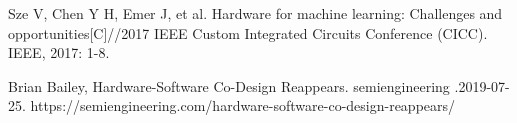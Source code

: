 \setlength{\bibsep}{1ex}  %
\begin{thebibliography}{99}
\thispagestyle{fancy}



Sze V, Chen Y H, Emer J, et al. Hardware for machine learning: Challenges and opportunities[C]//2017 IEEE Custom Integrated Circuits Conference (CICC). IEEE, 2017: 1-8.

Brian Bailey, Hardware-Software Co-Design Reappears. semiengineering .2019-07-25. https://semiengineering.com/hardware-software-co-design-reappears/
 



\end{thebibliography}